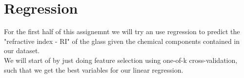 \section{Regression}
For the first half of this assignemnt we will try an use regression to predict the "refractive index - RI" of the glass given the chemical components contained in our dataset.\\
We will start of by just doing feature selection using one-of-k cross-validation, such that we get the best variables for our linear regression.
